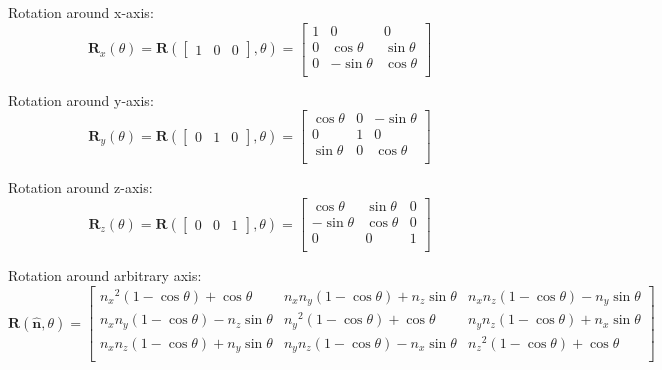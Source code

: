 \documentclass[a4paper,11pt]{article}
\begin{document}
Rotation around x-axis: \\
$$
\mathbf{R}_{x}(\theta) = 
\mathbf{R}(
\begin{bmatrix}
1 & 0 & 0 
\end{bmatrix},
\theta) =
 \begin{bmatrix}
1 & 0 & 0 \\
0 & {\cos\theta} & {\sin\theta} \\
0 & {- \sin\theta} & {\cos\theta} \\
\end{bmatrix}
$$

Rotation around y-axis: \\
$$
\mathbf{R}_{y}(\theta) = 
\mathbf{R}(
\begin{bmatrix}
0 & 1 & 0 
\end{bmatrix},
\theta) = \begin{bmatrix}
{\cos\theta} & 0 & {- \sin\theta} \\
0 & 1 & 0 \\
{\sin\theta} & 0 & {\cos\theta} \\
\end{bmatrix}
$$

Rotation around z-axis: \\
$$
\mathbf{R}_{z}(\theta) =
\mathbf{R}(
\begin{bmatrix}
0 & 0 & 1
\end{bmatrix},
\theta) =
\begin{bmatrix}
{\cos\theta} & {\sin\theta} & 0 \\
{- \sin\theta} & {\cos\theta} & 0 \\
0 & 0 & 1 \\
\end{bmatrix}
$$

Rotation around arbitrary axis: \\
$$
\mathbf{R}(\hat{\mathbf{n}},\theta) =
\begin{bmatrix}
{{n_{x}}^{2}\left( 1 - \cos\theta \right) + \cos\theta} & {n_{x}n_{y}\left( 1 - \cos\theta \right) + n_{z}\sin\theta} & {n_{x}n_{z}\left( 1 - \cos\theta \right) - n_{y}\sin\theta} \\
{n_{x}n_{y}\left( 1 - \cos\theta \right) - n_{z}\sin\theta} & {{n_{y}}^{2}\left( 1 - \cos\theta \right) + \cos\theta} & {n_{y}n_{z}\left( 1 - \cos\theta \right) + n_{x}\sin\theta} \\
{n_{x}n_{z}\left( 1 - \cos\theta \right) + n_{y}\sin\theta} & {n_{y}n_{z}\left( 1 - \cos\theta \right) - n_{x}\sin\theta} & {{n_{z}}^{2}\left( 1 - \cos\theta \right) + \cos\theta} \\
\end{bmatrix}
$$
\end{document}
